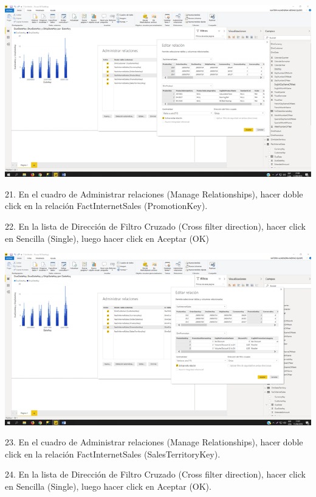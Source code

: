 \begin{center}
\includegraphics[width=15cm]{./Imagenes/img11} 
\end{center}
\item 21. En el cuadro de Administrar relaciones (Manage Relationships), hacer doble click en la relación
FactInternetSales (PromotionKey).
\item 22. En la lista de Dirección de Filtro Cruzado (Cross filter direction), hacer click en Sencilla (Single), luego hacer click en Aceptar (OK)

\begin{center}
\includegraphics[width=15cm]{./Imagenes/img12} 
\end{center}
\item 23. En el cuadro de Administrar relaciones (Manage Relationships), hacer doble click en la relación
FactInternetSales (SalesTerritoryKey).
\item 24. En la lista de Dirección de Filtro Cruzado (Cross filter direction), hacer click en Sencilla (Single), luego hacer click en Aceptar (OK). 

